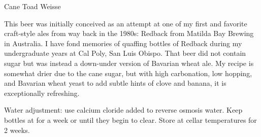 \begin{recipe}{Cane Toad Weisse}

\begin{aboutblock}
This beer was initially conceived as an attempt at one of my first and favorite
craft-style ales from way back in the 1980s: Redback from Matilda Bay Brewing
in Australia. I have fond memories of quaffing bottles of Redback during my
undergraduate years at Cal Poly, San Luis Obispo. That beer did not contain
sugar but was instead a down-under version of Bavarian wheat ale. My recipe is
somewhat drier due to the cane sugar, but with high carbonation, low hopping,
and Bavarian wheat yeast to add subtle hints of clove and banana, it is exceptionally
refreshing. 
\end{aboutblock}


\begin{methodandtiming}
 
\begin{mashsteps}
\end{mashsteps}

\begin{fermentationsteps}
\end{fermentationsteps}

\begin{directions}
Water adjustment: use  calcium cloride added to reverse osmosis water. 
Keep bottles at  for a week or until they begin to clear. Store at cellar
temperatures for 2 weeks.
\end{directions}

\end{methodandtiming}

\recipebreak

\begin{ingredientsblock}
    
\begin{malts}
\end{malts}

\begin{hops}

\end{hops}


\end{ingredientsblock}

\end{recipe}

